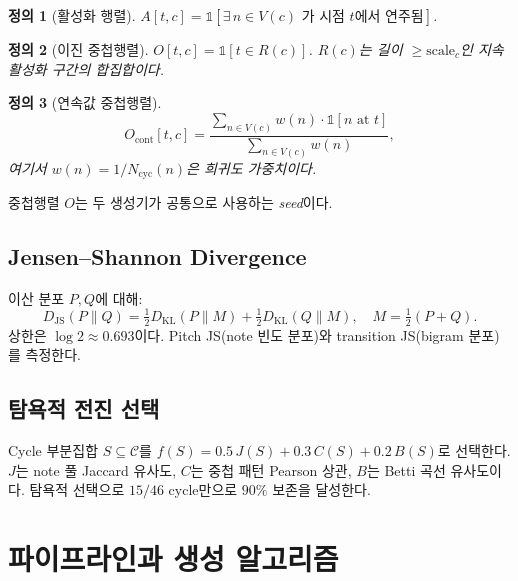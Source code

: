 \documentclass[11pt,a4paper]{article}
\newtheorem{definition}{정의}[section]
\begin{document}
\begin{definition}[활성화 행렬]
$A[t,c] = \mathbb{1}[\exists\, n \in V(c) \text{ 가 시점 } t \text{에서 연주됨}]$.
\end{definition}

\begin{definition}[이진 중첩행렬]
$O[t,c] = \mathbb{1}[t \in R(c)]$. $R(c)$는 길이 $\ge \mathrm{scale}_c$인
지속 활성화 구간의 합집합이다.
\end{definition}

\begin{definition}[연속값 중첩행렬]
\begin{equation}
O_{\mathrm{cont}}[t,c] = \frac{\sum_{n \in V(c)} w(n) \cdot \mathbb{1}[n \text{ at } t]}
                               {\sum_{n \in V(c)} w(n)},
\end{equation}
여기서 $w(n) = 1/N_{\mathrm{cyc}}(n)$은 희귀도 가중치이다.
\end{definition}

중첩행렬 $O$는 두 생성기가 공통으로 사용하는 \emph{seed}이다.

\subsection{Jensen--Shannon Divergence}
\label{subsec:js}

이산 분포 $P, Q$에 대해:
\begin{equation}
D_{\mathrm{JS}}(P \| Q) = \tfrac{1}{2} D_{\mathrm{KL}}(P \| M) +
                           \tfrac{1}{2} D_{\mathrm{KL}}(Q \| M),
\quad M = \tfrac{1}{2}(P+Q).
\end{equation}
상한은 $\log 2 \approx 0.693$이다. Pitch JS(note 빈도 분포)와
transition JS(bigram 분포)를 측정한다.

\subsection{탐욕적 전진 선택}
\label{subsec:greedy}

Cycle 부분집합 $S \subseteq \mathcal{C}$를
$f(S) = 0.5\,J(S) + 0.3\,C(S) + 0.2\,B(S)$로 선택한다.
$J$는 note 풀 Jaccard 유사도, $C$는 중첩 패턴 Pearson 상관,
$B$는 Betti 곡선 유사도이다. 탐욕적 선택으로 $15/46$ cycle만으로
$90\%$ 보존을 달성한다.


\section{파이프라인과 생성 알고리즘}
\label{sec:pipeline}
\end{document}
